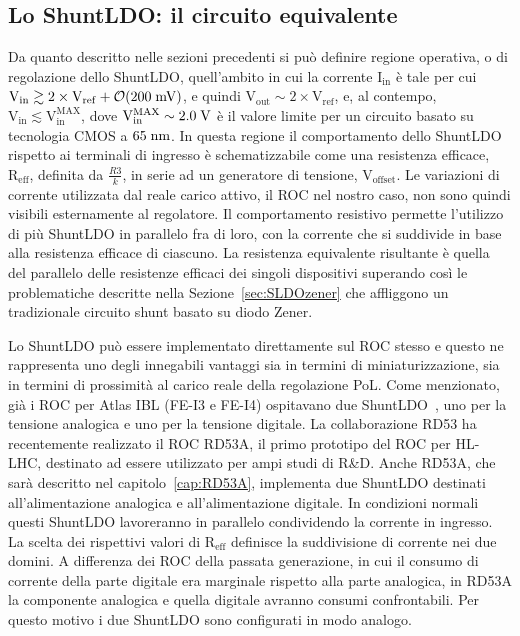 \subsection{Lo ShuntLDO: il circuito equivalente}

Da quanto descritto nelle sezioni precedenti si pu\`o definire regione operativa, o di regolazione dello ShuntLDO, quell'ambito in cui la corrente $\mathrm{I_{in}}$ \`e tale per cui $\mathrm{V_{in}\gtrsim 2\times V_{ref}}+{\cal O}\mathrm{(200\rm \; mV)}$, e quindi $\mathrm{V_{out}\sim 2\times V_{ref}}$, e, al contempo, $\mathrm{V_{in}\lesssim V_{in}^{MAX}}$, dove $\mathrm{V_{in}^{MAX}\sim2.0\rm \; V}$ è il valore limite per un circuito basato su tecnologia CMOS a $65\rm \; nm$. In questa regione il comportamento dello ShuntLDO rispetto ai terminali di ingresso \`e schematizzabile come una resistenza efficace, $\mathrm{R_{eff}}$, definita da $\frac{R3}{k}$, in serie ad un generatore di tensione, $\mathrm{V_{offset}}$. Le variazioni di corrente utilizzata dal reale carico attivo, il ROC nel nostro caso, non sono quindi visibili esternamente al regolatore.
Il comportamento resistivo permette l'utilizzo di più ShuntLDO in parallelo fra di loro, con la corrente che si suddivide in base alla resistenza efficace di ciascuno. La resistenza equivalente risultante \`e quella del parallelo delle resistenze efficaci dei singoli dispositivi superando cos\`i le problematiche descritte nella Sezione~\ref{sec:SLDOzener} che affliggono un tradizionale circuito shunt basato su diodo Zener.


Lo ShuntLDO pu\`o essere implementato direttamente sul ROC stesso e questo ne rappresenta uno degli innegabili vantaggi sia in termini di miniaturizzazione, sia in termini di prossimit\`a al carico reale della regolazione PoL. Come menzionato, gi\`a i ROC per Atlas IBL (FE-I3 e FE-I4) ospitavano due ShuntLDO~\cite{SerialPowering}, uno per la tensione analogica e uno per la tensione digitale. La collaborazione RD53 ha recentemente realizzato il ROC RD53A\cite{RD53A}, il primo prototipo del ROC per HL-LHC, destinato ad essere utilizzato per ampi studi di R\&D. Anche RD53A, che sar\`a descritto nel capitolo~\ref{cap:RD53A}, implementa due ShuntLDO destinati all'alimentazione analogica e all'alimentazione digitale. In condizioni normali questi ShuntLDO lavoreranno in parallelo condividendo la corrente in ingresso. La scelta dei rispettivi valori di $\mathrm{R_{eff}}$ definisce la suddivisione di corrente nei due domini. A differenza dei ROC della passata generazione, in cui il consumo di corrente della parte digitale era marginale rispetto alla parte analogica, in RD53A la componente analogica e quella digitale avranno consumi confrontabili. Per questo motivo i due ShuntLDO sono configurati in modo analogo.


